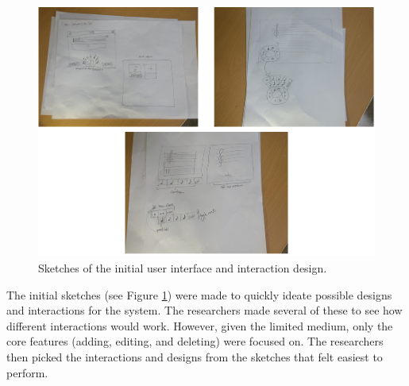 			\begin{figure}[H]
				\centering
				\includegraphics[scale=0.4]{figures/initial_sketches.png}
			    \caption{Sketches of the initial user interface and interaction design.}
			    \label{fig:initial_sketches}
			\end{figure}


			The initial sketches (see Figure \ref{fig:initial_sketches}) were made to quickly ideate possible designs and interactions for the system. The researchers made several of these to see how different interactions would work. However, given the limited medium, only the core features (adding, editing, and deleting) were focused on. The researchers then picked the interactions and designs from the sketches that felt easiest to perform.

